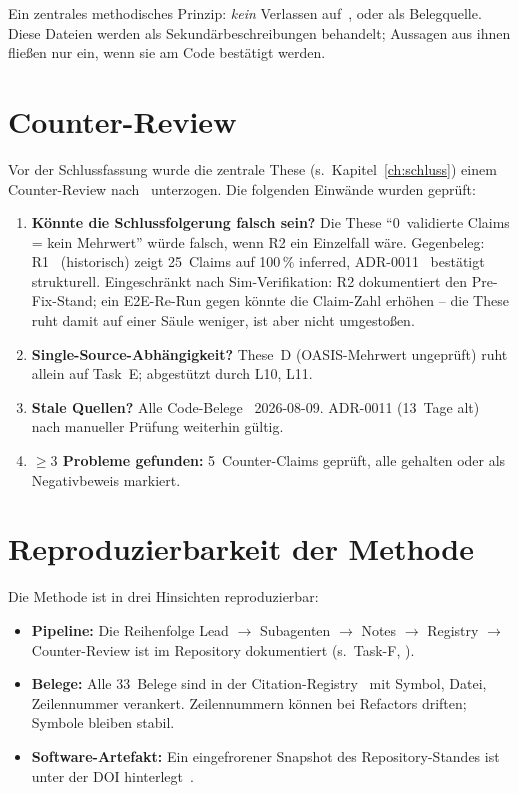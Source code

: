 Ein zentrales methodisches Prinzip: \emph{kein} Verlassen auf~,  oder  als Belegquelle. Diese Dateien werden als Sekundärbeschreibungen behandelt; Aussagen aus ihnen fließen nur ein, wenn sie am Code bestätigt werden.

\section{Counter-Review}\label{sec:counter-review}

Vor der Schlussfassung wurde die zentrale These (s.\ Kapitel~\ref{ch:schluss}) einem Counter-Review nach~\cite{arxiv:counter-review-methodik} unterzogen. Die folgenden Einwände wurden geprüft:

\begin{enumerate}
  \item \textbf{Könnte die Schlussfolgerung falsch sein?} Die These \enquote{0~validierte Claims = kein Mehrwert} würde falsch, wenn R2 ein Einzelfall wäre. Gegenbeleg: R1~\cite{audit-r1} (historisch) zeigt 25~Claims auf 100\,\% inferred, ADR-0011~\cite{adr-0011} bestätigt strukturell. Eingeschränkt nach Sim-Verifikation: R2 dokumentiert den Pre-Fix-Stand; ein E2E-Re-Run gegen  könnte die Claim-Zahl erhöhen -- die These ruht damit auf einer Säule weniger, ist aber nicht umgestoßen.
  \item \textbf{Single-Source-Abhängigkeit?} These~D (OASIS-Mehrwert ungeprüft) ruht allein auf Task~E; abgestützt durch L10, L11.
  \item \textbf{Stale Quellen?} Alle Code-Belege ~2026-08-09. ADR-0011 (13~Tage alt) nach manueller Prüfung weiterhin gültig.
  \item \textbf{$\geq 3$ Probleme gefunden:} 5~Counter-Claims geprüft, alle gehalten oder als Negativbeweis markiert.
\end{enumerate}

\section{Reproduzierbarkeit der Methode}\label{sec:reproduzierbarkeit}

Die Methode ist in drei Hinsichten reproduzierbar:

\begin{itemize}
  \item \textbf{Pipeline:} Die Reihenfolge Lead $\to$ Subagenten $\to$ Notes $\to$ Registry $\to$ Counter-Review ist im Repository dokumentiert (s.\ Task-F, ).
  \item \textbf{Belege:} Alle 33~Belege sind in der Citation-Registry~\cite{citation-registry} mit Symbol, Datei, Zeilennummer verankert. Zeilennummern können bei Refactors driften; Symbole bleiben stabil.
  \item \textbf{Software-Artefakt:} Ein eingefrorener Snapshot des Repository-Standes ist unter der DOI  hinterlegt~\cite{zenodo-agora}.
\end{itemize}


